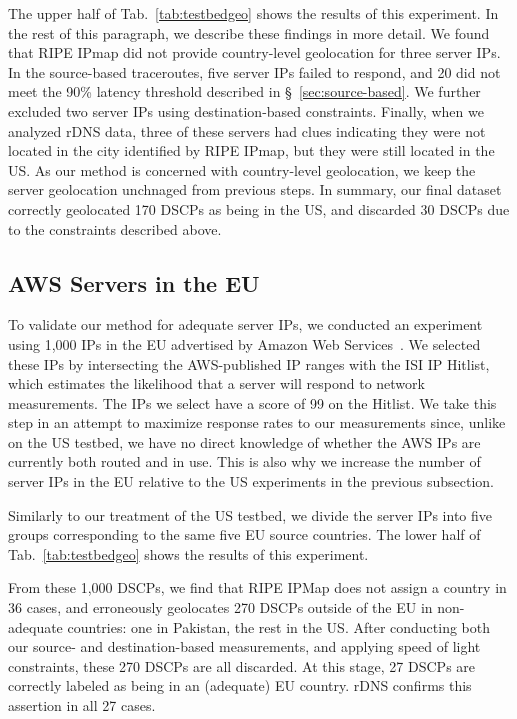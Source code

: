 The upper half of Tab.~\ref{tab:testbedgeo} shows the results of this
experiment. In the rest of this paragraph, we describe these 
findings in more detail. 
We found that RIPE IPmap did not provide country-level geolocation 
for three server IPs. %
In the source-based traceroutes, five server IPs failed to respond, and 20 did not meet the 90\% 
latency threshold described in \S~\ref{sec:source-based}. 
We further excluded two server IPs
using destination-based constraints. %
Finally, when we analyzed rDNS data, 
three of these servers had clues indicating they were not located in the city identified by RIPE IPmap,
but they were still located in the US. As our method is concerned with
country-level geolocation, we keep the server geolocation unchnaged from previous steps.
In summary, our final dataset correctly geolocated 170 DSCPs 
as being in the US,
and discarded 30 DSCPs due to the constraints described above.








\vspace{-10mm}
\subsection{AWS Servers in the EU}

To validate our method for adequate server IPs, 
we conducted an experiment using 1,000 IPs in the EU 
advertised by Amazon Web Services~\cite{aws_ip_ranges}. 
We selected these IPs by intersecting the AWS-published IP ranges
with the ISI IP Hitlist,~\cite{ant_hitlist} which estimates the likelihood
that a server will respond to network measurements.
The IPs we select have a score of 99 on the Hitlist. 
We take this step in an attempt to maximize response rates to our measurements 
since, unlike on the US testbed, 
we have no direct knowledge of whether the AWS IPs are currently
both routed and in use. This is also why we increase the 
number of server IPs in the EU relative to the US experiments in the previous
subsection.

Similarly to our treatment of the US testbed, we divide the server IPs 
into five groups corresponding to the same five 
EU source countries. 
The lower half of Tab.~\ref{tab:testbedgeo} shows the results of this experiment.

From these 1,000 DSCPs, we find that RIPE IPMap 
does not assign a country in 36 cases, and erroneously geolocates 
270 DSCPs outside of the EU in non-adequate countries: 
one in Pakistan, the rest in the US. 
After conducting both our source- and destination-based measurements, 
and applying speed of light constraints, these 270 DSCPs are all discarded.
At this stage, 27 DSCPs are correctly labeled as being in an (adequate)
EU country.
rDNS confirms this assertion in all 27 cases.



